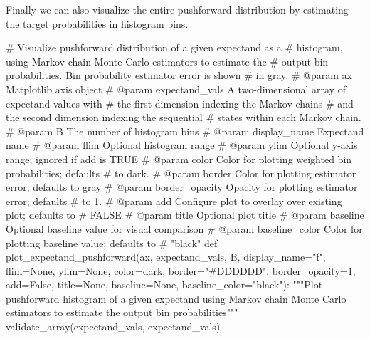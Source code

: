 \documentclass[
  letterpaper,
  DIV=11,
  numbers=noendperiod]{scrartcl}
\newenvironment{Shaded}{\begin{snugshade}}{\end{snugshade}}
\newcommand{\CommentTok}[1]{\textcolor[rgb]{0.37,0.37,0.37}{#1}}
\newcommand{\DecValTok}[1]{\textcolor[rgb]{0.68,0.00,0.00}{#1}}
\newcommand{\KeywordTok}[1]{\textcolor[rgb]{0.00,0.23,0.31}{#1}}
\newcommand{\NormalTok}[1]{\textcolor[rgb]{0.00,0.23,0.31}{#1}}
\newcommand{\OperatorTok}[1]{\textcolor[rgb]{0.37,0.37,0.37}{#1}}
\newcommand{\StringTok}[1]{\textcolor[rgb]{0.13,0.47,0.30}{#1}}
\newcommand{\VariableTok}[1]{\textcolor[rgb]{0.07,0.07,0.07}{#1}}
\begin{document}
Finally we can also visualize the entire pushforward distribution by
estimating the target probabilities in histogram bins.

\begin{Shaded}
\begin{Highlighting}[]
\CommentTok{\# Visualize pushforward distribution of a given expectand as a}
\CommentTok{\# histogram, using Markov chain Monte Carlo estimators to estimate the}
\CommentTok{\# output bin probabilities.  Bin probability estimator error is shown}
\CommentTok{\# in gray.}
\CommentTok{\# @param ax Matplotlib axis object}
\CommentTok{\# @param expectand\_vals A two{-}dimensional array of expectand values with}
\CommentTok{\#                       the first dimension indexing the Markov chains}
\CommentTok{\#                       and the second dimension indexing the sequential}
\CommentTok{\#                       states within each Markov chain.}
\CommentTok{\# @param B The number of histogram bins}
\CommentTok{\# @param display\_name Expectand name}
\CommentTok{\# @param flim Optional histogram range}
\CommentTok{\# @param ylim Optional y{-}axis range; ignored if add is TRUE}
\CommentTok{\# @param color Color for plotting weighted bin probabilities; defaults}
\CommentTok{\#              to dark.}
\CommentTok{\# @param border Color for plotting estimator error; defaults to gray}
\CommentTok{\# @param border\_opacity Opacity for plotting estimator error; defaults}
\CommentTok{\#                       to 1.}
\CommentTok{\# @param add Configure plot to overlay over existing plot; defaults to}
\CommentTok{\#            FALSE}
\CommentTok{\# @param title Optional plot title}
\CommentTok{\# @param baseline Optional baseline value for visual comparison}
\CommentTok{\# @param baseline\_color Color for plotting baseline value; defaults to}
\CommentTok{\#                       "black"}
\KeywordTok{def}\NormalTok{ plot\_expectand\_pushforward(ax, expectand\_vals, B, display\_name}\OperatorTok{=}\StringTok{"f"}\NormalTok{,}
\NormalTok{                               flim}\OperatorTok{=}\VariableTok{None}\NormalTok{, ylim}\OperatorTok{=}\VariableTok{None}\NormalTok{,}
\NormalTok{                               color}\OperatorTok{=}\NormalTok{dark, border}\OperatorTok{=}\StringTok{"\#DDDDDD"}\NormalTok{,}
\NormalTok{                               border\_opacity}\OperatorTok{=}\DecValTok{1}\NormalTok{,}
\NormalTok{                               add}\OperatorTok{=}\VariableTok{False}\NormalTok{, title}\OperatorTok{=}\VariableTok{None}\NormalTok{,}
\NormalTok{                               baseline}\OperatorTok{=}\VariableTok{None}\NormalTok{, baseline\_color}\OperatorTok{=}\StringTok{"black"}\NormalTok{):}
  \CommentTok{"""Plot pushforward histogram of a given expectand using Markov chain}
\CommentTok{     Monte Carlo estimators to estimate the output bin probabilities"""}
\NormalTok{  validate\_array(expectand\_vals, }\StringTok{\textquotesingle{}expectand\_vals\textquotesingle{}}\NormalTok{)}
    

\end{Highlighting}
\end{Shaded}
\end{document}
